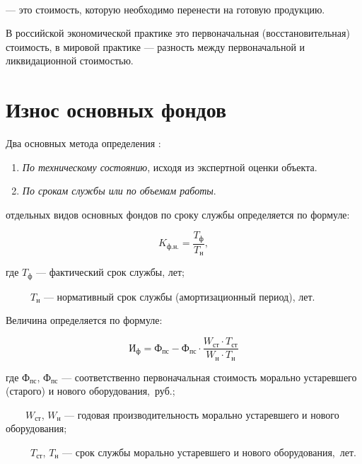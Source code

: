 \begin{definition}
    \normalfont
    ~\\
     --- это стоимость, которую
    необходимо перенести на готовую продукцию.
\end{definition}

В российской экономической практике это первоначальная
(восстановительная) стоимость, в мировой практике --- разность между
первоначальной и ликвидационной стоимостью.

\clearpage
\section{Износ основных фондов}

Два основных метода определения :

\begin{enumerate}
    \item \textit{По техническому состоянию}, исходя из экспертной оценки объекта.
    \item \textit{По срокам службы или по объемам работы}.
\end{enumerate}

\begin{tcolorbox}
 отдельных видов основных фондов по сроку
службы определяется по формуле:

\begin{equation}
    K_{\text{ф.н.}} = \frac{T_{\text{ф}}}{T_{\text{н}}},
\end{equation}

где $T_{\text{ф}}$ --- фактический срок службы, лет;

~~~~~$T_{\text{н}}$ --- нормативный срок службы (амортизационный период), лет.
\end{tcolorbox}

\begin{tcolorbox}
Величина  определяется по формуле:

\begin{equation}
    \text{И}_{\text{ф}} = \text{Ф}_{\text{пс}} - \text{Ф}_{\text{пс}} \cdot
    \frac{W_{\text{ст}} \cdot T_{\text{ст}}}{W_{\text{н}} \cdot T_{\text{н}}}
\end{equation}

где $\text{Ф}_{\text{пс}}$, $\text{Ф}_{\text{пс}}$ --- соответственно
первоначальная стоимость морально устаревшего (старого) и нового
оборудования,~руб.;

~~~~$W_{\text{ст}}$, $W_{\text{н}}$ --- годовая производительность морально
устаревшего и нового оборудования;

~~~~~$T_{\text{ст}}$, $T_{\text{н}}$ --- срок службы морально устаревшего и нового
оборудования,~лет.
\end{tcolorbox}

